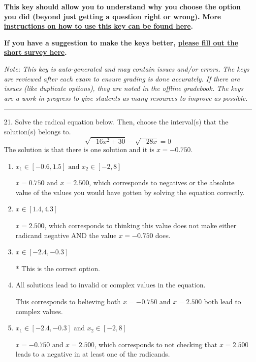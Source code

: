 \documentclass{extbook}[14pt]
\begin{document}
\textbf{This key should allow you to understand why you choose the option you did (beyond just getting a question right or wrong). \href{https://xronos.clas.ufl.edu/mac1105spring2020/courseDescriptionAndMisc/Exams/LearningFromResults}{More instructions on how to use this key can be found here}.}

\textbf{If you have a suggestion to make the keys better, \href{https://forms.gle/CZkbZmPbC9XALEE88}{please fill out the short survey here}.}

\textit{Note: This key is auto-generated and may contain issues and/or errors. The keys are reviewed after each exam to ensure grading is done accurately. If there are issues (like duplicate options), they are noted in the offline gradebook. The keys are a work-in-progress to give students as many resources to improve as possible.}

\rule{\textwidth}{0.4pt}

21. Solve the radical equation below. Then, choose the interval(s) that the solution(s) belongs to.
\[ \sqrt{-16 x^2 + 30} - \sqrt{-28 x} = 0 \] 
The solution is $ \text{that there is one solution and it is } x = -0.750. $ 

\begin{enumerate}[label=\Alph*.] 
\item $ x_1 \in [-0.6, 1.5] \text{ and } x_2 \in [-2,8] $ 

 $x = 0.750 \text{ and } x = 2.500$, which corresponds to negatives or the absolute value of the values you would have gotten by solving the equation correctly. 
\item $ x \in [1.4,4.3] $ 

 $x = 2.500$, which corresponds to thinking this value does not make either radicand negative AND the value $x = -0.750$ does. 
\item $ x \in [-2.4,-0.3] $ 

 * This is the correct option. 
\item $ \text{All solutions lead to invalid or complex values in the equation.} $ 

 This corresponds to believing both $x = -0.750 \text{ and } x = 2.500$ both lead to complex values. 
\item $ x_1 \in [-2.4, -0.3] \text{ and } x_2 \in [-2,8] $ 

 $x = -0.750 \text{ and } x = 2.500$, which corresponds to not checking that $x = 2.500$ leads to a negative in at least one of the radicands. 
\end{enumerate} 
 
\end{document}

